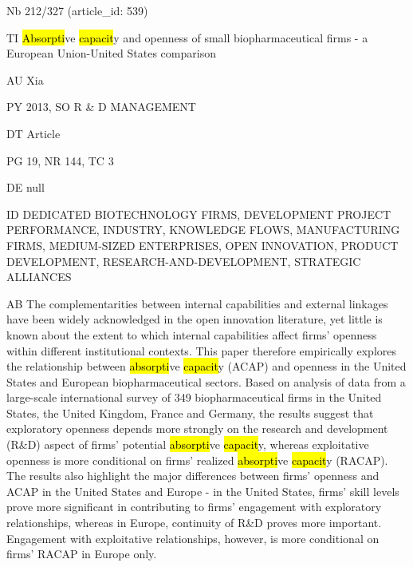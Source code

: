 \documentclass[a4paper]{article}
\begin{document}
\vspace*{-2cm}
Nb \tabto{0cm}212/327 (article\_id: 539)\par
TI \tabto{0cm}\hl{Absorpti}ve \hl{capacit}y and openness of small biopharmaceutical firms - a European Union-United States comparison\par
AU \tabto{0cm}Xia\par
PY \tabto{0cm}2013, SO R \& D MANAGEMENT\par
DT \tabto{0cm}Article\par
PG \tabto{0cm}19, NR 144, TC 3\par
DE \tabto{0cm}null\par
ID \tabto{0cm}DEDICATED BIOTECHNOLOGY FIRMS, DEVELOPMENT PROJECT PERFORMANCE, INDUSTRY, KNOWLEDGE FLOWS, MANUFACTURING FIRMS, MEDIUM-SIZED ENTERPRISES, OPEN INNOVATION, PRODUCT DEVELOPMENT, RESEARCH-AND-DEVELOPMENT, STRATEGIC ALLIANCES\par
AB \tabto{0cm}The complementarities between internal capabilities and external linkages have been widely acknowledged in the open innovation literature, yet little is known about the extent to which internal capabilities affect firms' openness within different institutional contexts. This paper therefore empirically explores the relationship between \hl{absorpti}ve \hl{capacit}y (ACAP) and openness in the United States and European biopharmaceutical sectors. Based on analysis of data from a large-scale international survey of 349 biopharmaceutical firms in the United States, the United Kingdom, France and Germany, the results suggest that exploratory openness depends more strongly on the research and development (R\&D) aspect of firms' potential \hl{absorpti}ve \hl{capacit}y, whereas exploitative openness is more conditional on firms' realized \hl{absorpti}ve \hl{capacit}y (RACAP). The results also highlight the major differences between firms' openness and ACAP in the United States and Europe - in the United States, firms' skill levels prove more significant in contributing to firms' engagement with exploratory relationships, whereas in Europe, continuity of R\&D proves more important. Engagement with exploitative relationships, however, is more conditional on firms' RACAP in Europe only.\par
\clearpage
\end{document}
